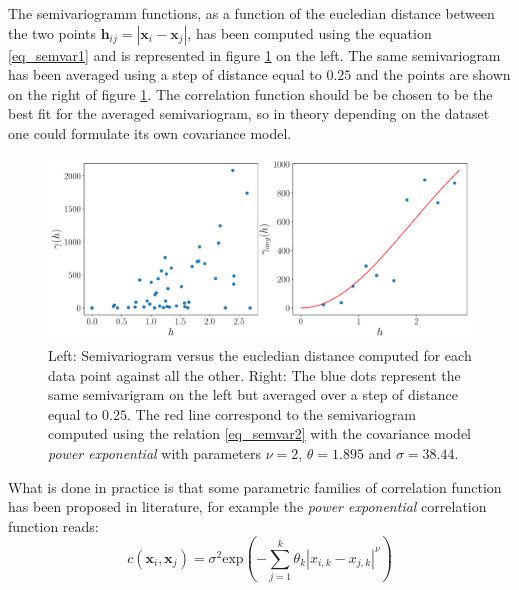 The semivariogramm functions, as a function of the eucledian distance between the two points $\mathbf{h}_{ij} = |\mathbf{x}_i - \mathbf{x}_j|$, has been computed using the equation \eqref{eq_semvar1} and is represented in figure \ref{fig:semivariogram} on the left. The same semivariogram has been averaged using a step of distance equal to $0.25$ and the points are shown on the right of figure \ref{fig:semivariogram}.
The correlation function should be be chosen to be the best fit for the averaged semivariogram, so in theory depending on the dataset one could formulate its own covariance model.

\begin{figure}[ht]
	\centering
	\includegraphics[width=0.9\linewidth]{appendix_a/sem}
	\caption{Left: Semivariogram versus the eucledian distance computed for each data point against all the other.  Right: The blue dots represent the same semivarigram on the left but averaged over a step of distance equal to $0.25$. The red line correspond to the semivariogram computed using the relation \eqref{eq_semvar2} with the covariance model \textit{power exponential} with parameters $\nu=2$, $\theta=1.895$ and $\sigma=38.44$.}
	\label{fig:semivariogram}
\end{figure}

What is done in practice is that some parametric families of correlation function has been proposed in literature, for example the \textit{power exponential} correlation function reads:
\begin{equation}
c(\mathbf{x}_{i} , \mathbf{x}_{j})  = \sigma^2 \textrm{exp}\left( -\sum_{j=1}^{k} \theta_k {|{x}_{i,k} - {x}_{j,k} |}^\nu \right)
\end{equation}

